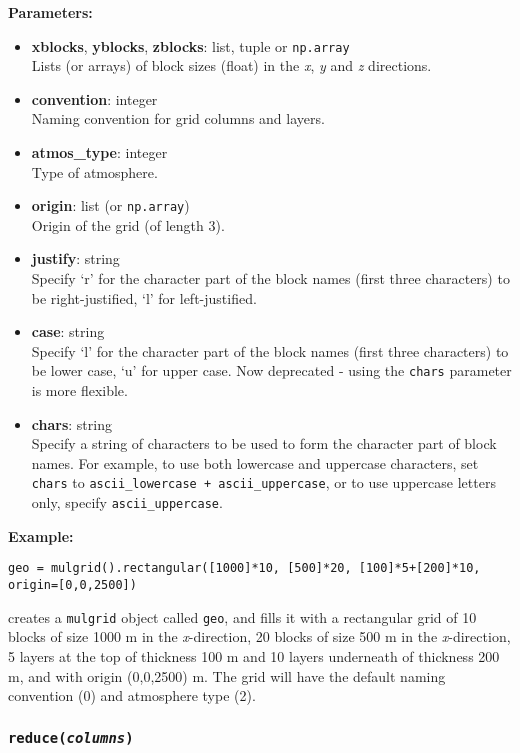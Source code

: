 \textbf{Parameters:}
\begin{itemize}
\item \textbf{xblocks}, \textbf{yblocks}, \textbf{zblocks}: list, tuple or \texttt{np.array}\\
  Lists (or arrays) of block sizes (float) in the \emph{x}, \emph{y} and \emph{z} directions.
\item \textbf{convention}: integer\\
  Naming convention for grid columns and layers.
\item \textbf{atmos\_type}: integer\\
  Type of atmosphere.
\item \textbf{origin}: list (or \texttt{np.array})\\
  Origin of the grid (of length 3).
\item \textbf{justify}: string\\
  Specify `r' for the character part of the block names (first three characters) to be right-justified, `l' for left-justified.
\item \textbf{case}: string\\
  Specify `l' for the character part of the block names (first three characters) to be lower case, `u' for upper case.  Now deprecated - using the \texttt{chars} parameter is more flexible.
\item \textbf{chars}: string\\
  Specify a string of characters to be used to form the character part of block names.  For example, to use both lowercase and uppercase characters, set \texttt{chars} to \texttt{ascii\_lowercase + ascii\_uppercase}, or to use uppercase letters only, specify \texttt{ascii\_uppercase}.
\end{itemize}

\textbf{Example:}

\begin{lstlisting}
geo = mulgrid().rectangular([1000]*10, [500]*20, [100]*5+[200]*10, origin=[0,0,2500])
\end{lstlisting}

creates a \texttt{mulgrid} object called \texttt{geo}, and fills it with a rectangular grid of 10 blocks of size 1000 m in the \emph{x}-direction, 20 blocks of size 500 m in the \emph{x}-direction, 5 layers at the top of thickness 100 m and 10 layers underneath of thickness 200 m, and with origin (0,0,2500) m.  The grid will have the default naming convention (0) and atmosphere type (2).

\begin{snugshade}\subsubsection{\texttt{reduce(\emph{columns})}}\end{snugshade}
\label{sec:mulgrid:reduce}

